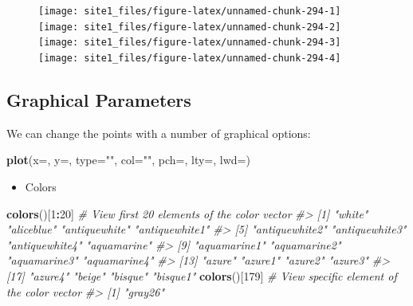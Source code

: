 \documentclass[]{book}
\newenvironment{Shaded}{\begin{snugshade}}{\end{snugshade}}
\newcommand{\KeywordTok}[1]{\textcolor[rgb]{0.13,0.29,0.53}{\textbf{#1}}}
\newcommand{\DataTypeTok}[1]{\textcolor[rgb]{0.13,0.29,0.53}{#1}}
\newcommand{\DecValTok}[1]{\textcolor[rgb]{0.00,0.00,0.81}{#1}}
\newcommand{\StringTok}[1]{\textcolor[rgb]{0.31,0.60,0.02}{#1}}
\newcommand{\CommentTok}[1]{\textcolor[rgb]{0.56,0.35,0.01}{\textit{#1}}}
\newcommand{\OperatorTok}[1]{\textcolor[rgb]{0.81,0.36,0.00}{\textbf{#1}}}
\newcommand{\NormalTok}[1]{#1}
\providecommand{\tightlist}{%
  \setlength{\itemsep}{0pt}\setlength{\parskip}{0pt}}
\begin{document}
\begin{figure}

{\centering \texttt{[image: site1\_files/figure-latex/unnamed-chunk-294-1]} \texttt{[image: site1\_files/figure-latex/unnamed-chunk-294-2]} \texttt{[image: site1\_files/figure-latex/unnamed-chunk-294-3]} \texttt{[image: site1\_files/figure-latex/unnamed-chunk-294-4]} 

}

\caption{ }\label{fig:unnamed-chunk-294}
\end{figure}

\subsection{Graphical Parameters}\label{graphical-parameters}

We can change the points with a number of graphical options:

\begin{Shaded}
\begin{Highlighting}[]
\KeywordTok{plot}\NormalTok{(}\DataTypeTok{x=}\NormalTok{, }\DataTypeTok{y=}\NormalTok{, }\DataTypeTok{type=}\StringTok{""}\NormalTok{, }\DataTypeTok{col=}\StringTok{""}\NormalTok{, }\DataTypeTok{pch=}\NormalTok{, }\DataTypeTok{lty=}\NormalTok{, }\DataTypeTok{lwd=}\NormalTok{)}
\end{Highlighting}
\end{Shaded}

\begin{itemize}
\tightlist
\item
  Colors
\end{itemize}

\begin{Shaded}
\begin{Highlighting}[]
\KeywordTok{colors}\NormalTok{()[}\DecValTok{1}\OperatorTok{:}\DecValTok{20}\NormalTok{] }\CommentTok{# View first 20 elements of the color vector}
\CommentTok{#>  [1] "white"         "aliceblue"     "antiquewhite"  "antiquewhite1"}
\CommentTok{#>  [5] "antiquewhite2" "antiquewhite3" "antiquewhite4" "aquamarine"   }
\CommentTok{#>  [9] "aquamarine1"   "aquamarine2"   "aquamarine3"   "aquamarine4"  }
\CommentTok{#> [13] "azure"         "azure1"        "azure2"        "azure3"       }
\CommentTok{#> [17] "azure4"        "beige"         "bisque"        "bisque1"}
\KeywordTok{colors}\NormalTok{()[}\DecValTok{179}\NormalTok{] }\CommentTok{# View specific element of the color vector}
\CommentTok{#> [1] "gray26"}
\end{Highlighting}
\end{Shaded}
\end{document}

